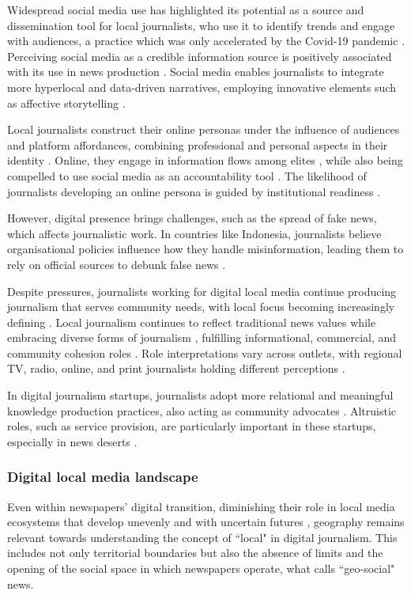 \documentclass[english]{textolivre}
\begin{document}
Widespread social media use has highlighted its potential as a source and dissemination tool for local journalists, who use it to identify trends and engage with audiences, a practice which was only accelerated by the Covid-19 pandemic \cite{zhang2022}. Perceiving social media as a credible information source is positively associated with its use in news production \cite{zhang2020}. Social media enables journalists to integrate more hyperlocal and data-driven narratives, employing innovative elements such as affective storytelling \cite{chen2023}.

Local journalists construct their online personas under the influence of audiences and platform affordances, combining professional and personal aspects in their identity \cite{baftiu2023}. Online, they engage in information flows among elites \cite{habel2018}, while also being compelled to use social media as an accountability tool \cite{slavtchevapetkova2016}. The likelihood of journalists developing an online persona is guided by institutional readiness \cite{hamzah2020}.

However, digital presence brings challenges, such as the spread of fake news, which affects journalistic work. In countries like Indonesia, journalists believe organisational policies influence how they handle misinformation, leading them to rely on official sources to debunk false news \cite{kwanda2020}.

Despite pressures, journalists working for digital local media continue producing journalism that serves community needs, with local focus becoming increasingly defining \cite{sjovaag2015}. Local journalism continues to reflect traditional news values while embracing diverse forms of journalism \cite{jenkins2020b}, fulfilling informational, commercial, and community cohesion roles \cite{matthews2023}. Role interpretations vary across outlets, with regional TV, radio, online, and print journalists holding different perceptions \cite{fisher2022}.

In digital journalism startups, journalists adopt more relational and meaningful knowledge production practices, also acting as community advocates \cite{anderson2023}. Altruistic roles, such as service provision, are particularly important in these startups, especially in news deserts \cite{finneman2022}.

\subsubsection{Digital local media landscape}
Even within newspapers’ digital transition, diminishing their role in local media ecosystems that develop unevenly and with uncertain futures \cite{nielsen2015}, geography remains relevant towards understanding the concept of ``local" in digital journalism. This includes not only territorial boundaries but also the absence of limits and the opening of the social space in which newspapers operate, what \textcite{hess2013} calls ``geo-social" news.
\end{document}
